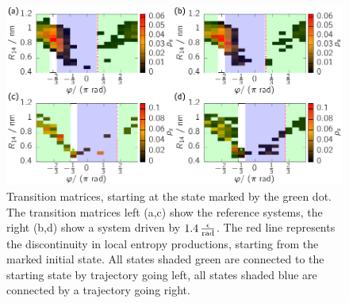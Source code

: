 \begin{figure}[t]
 \centering 
 \includegraphics{../plots/Frew/Tv.pdf}
 \caption[Transition matrices of chosen initial point for the tetraalanine peptide reference model and a model driven along the dihedral angle. ]{Transition matrices, starting at the state marked by the green dot. The transition matrices left (a,c) show the reference systems, the right (b,d) show a system driven by $1.4\,\frac{\epsilon}{{\footnotesize\text{rad}}}$. The red line represents the discontinuity in local entropy productions, starting from the marked initial state. All states shaded green are connected to the starting state by trajectory going left, all states shaded blue are connected by a trajectory going right.  }
 \label{fig:dS}
\end{figure}
